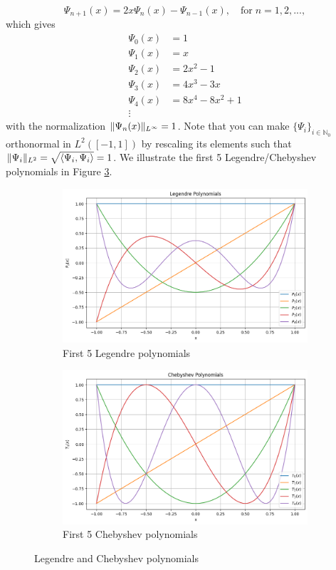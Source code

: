 \documentclass[12pt, oneside]{report}   	%
\newcommand{\N}{\mathbb{N}}
\DeclarePairedDelimiter{\norm}{\lVert}{\rVert}        %
\DeclarePairedDelimiter{\inner}{\langle}{\rangle}
\begin{document}
$$
\Psi_{n+1}(x) = 2x\Psi_n(x) - \Psi_{n-1}(x), \quad \text{for} \; n=1,2,...,
$$
which gives
\begin{align*}
\Psi_0(x) &= 1 \\
\Psi_1(x) &= x \\
\Psi_2(x) &= 2x^2-1 \\
\Psi_3(x) &= 4x^3-3x \\
\Psi_4(x) &= 8x^4 - 8x^2 + 1 \\
\vdots
\end{align*}
with the normalization $\norm{\Psi_n(x)}_{L^{\infty}}=1$. Note that you can make $\{\Psi_i\}_{i\in\N_0}$ orthonormal in $L^2([-1,1])$ by rescaling its elements such that $\norm{\Psi_i}_{L^2}=\sqrt{\inner{\Psi_i, \Psi_i}}=1$. We illustrate the first 5 Legendre/Chebyshev polynomials in Figure \ref{fig:legendrencheby}.

\begin{figure}[t]
     \centering
     \begin{subfigure}[b]{0.45\textwidth}
         \centering
         \includegraphics[width=\textwidth]{legendre.png}
         \caption{First 5 Legendre polynomials}
         \label{fig:legendre}
     \end{subfigure}
     \hfill
     \begin{subfigure}[b]{0.45\textwidth}
         \centering
         \includegraphics[width=\textwidth]{chebyshev.png}
         \caption{First 5 Chebyshev polynomials}
         \label{fig:cheby}
     \end{subfigure}
        \caption{Legendre and Chebyshev polynomials}
        \label{fig:legendrencheby}
\end{figure}
\end{document}
